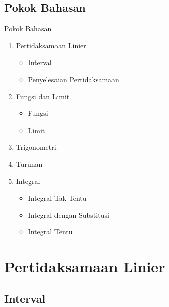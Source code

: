 \documentclass[pdflatex,compress,mathserif]{beamer}
\begin{document}
	\subsection{Pokok Bahasan}
		\begin{frame}{Pokok Bahasan}
			\begin{multicols}{2}
				\begin{enumerate}
					\item Pertidaksamaan Linier
					\begin{itemize}
						\item Interval
						\item Penyelesaian Pertidaksamaan
					\end{itemize}
					\item Fungsi dan Limit
					\begin{itemize}
						\item Fungsi
						\item Limit
					\end{itemize}
					\item Trigonometri
					\item Turunan
					\item Integral
					\begin{itemize}
						\item Integral Tak Tentu
						\item Integral dengan Substitusi
						\item Integral Tentu
					\end{itemize}
				\end{enumerate}
			\end{multicols}
		\end{frame}

\section{Pertidaksamaan Linier}

	\subsection{Interval}
\end{document}

